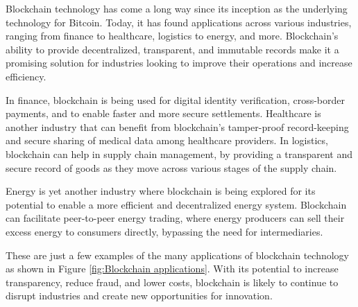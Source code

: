 Blockchain technology has come a long way since its inception as the underlying technology for Bitcoin. Today, it has found applications across various industries, ranging from finance to healthcare, logistics to energy, and more. Blockchain's ability to provide decentralized, transparent, and immutable records make it a promising solution for industries looking to improve their operations and increase efficiency.

In finance, blockchain is being used for digital identity verification, cross-border payments, and to enable faster and more secure settlements. Healthcare is another industry that can benefit from blockchain's tamper-proof record-keeping and secure sharing of medical data among healthcare providers. In logistics, blockchain can help in supply chain management, by providing a transparent and secure record of goods as they move across various stages of the supply chain.

Energy is yet another industry where blockchain is being explored for its potential to enable a more efficient and decentralized energy system. Blockchain can facilitate peer-to-peer energy trading, where energy producers can sell their excess energy to consumers directly, bypassing the need for intermediaries.

These are just a few examples of the many applications of blockchain technology as shown in Figure \ref{fig:Blockchain applications}. With its potential to increase transparency, reduce fraud, and lower costs, blockchain is likely to continue to disrupt industries and create new opportunities for innovation.

